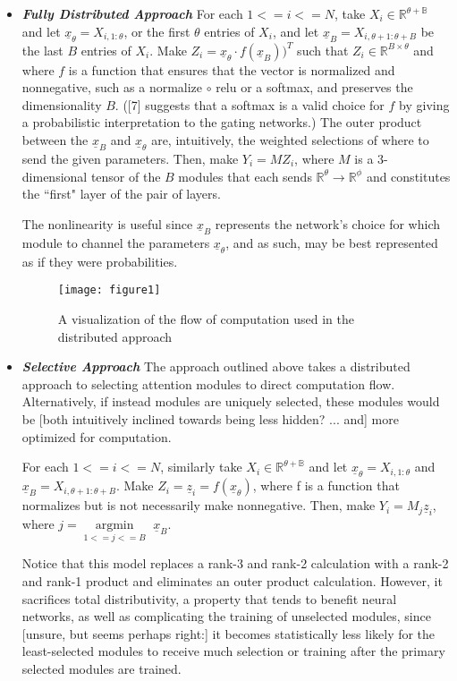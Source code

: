 \documentclass[12pt]{article}
\begin{document}
\begin{itemize}
	
\item \label{Fully Distributed} \textit{\textbf{Fully Distributed Approach}} For each $1<=i<=N$, take $X_i \in \mathbb{R^{\theta+B}}$ and let $\underline{x}_\theta = X_{i,1:\theta}$, or the first $\theta$ entries of $X_i$, and let $\underline{x}_B = X_{i, \theta+1:\theta+B}$ be the last $B$ entries of $X_i$.  Make $Z_i = \underline{x}_\theta \cdot f(\underline{x}_B))^{T}$ such that $Z_i \in \mathbb{R}^{B\times\theta}$ and where $f$ is a function that ensures that the vector is normalized and nonnegative, such as a normalize $\circ$ relu or a softmax, and preserves the dimensionality $B$.  ([7] suggests that a softmax is a valid choice for $f$ by giving a probabilistic interpretation to the gating networks.) The outer product between the $\underline{x}_B$ and $\underline{x}_\theta$ are, intuitively, the weighted selections of where to send the given parameters. Then, make $Y_i = MZ_i$, where $M$ is a 3-dimensional tensor of the $B$ modules that each sends $\mathbb{R}^{\theta}\rightarrow\mathbb{R}^{\phi}$ and constitutes the ``first" layer of the pair of layers.
\par The nonlinearity is useful since $\underline{x}_B$ represents the network's choice for which module to channel the parameters $\underline{x}_\theta$, and as such, may be best represented as if they were probabilities.\par
\begin{figure}[h]
\centering
\texttt{[image: figure1]}
\centering
\caption{A visualization of the flow of computation used in the distributed approach}
\end{figure}

\item \label{Selective Approach} \textit{\textbf{Selective Approach}} The approach outlined above takes a distributed approach to selecting attention modules to direct computation flow.  Alternatively, if instead modules are uniquely selected, these modules would be [both intuitively inclined towards being less hidden? ... and] more optimized for computation.\par
For each $1<=i<=N$, similarly take $X_i \in \mathbb{R^{\theta+B}}$ and let $\underline{x}_\theta = X_{i,1:\theta}$ and $\underline{x}_B = X_{i, \theta+1:\theta+B}$.  Make $Z_i = \underline{z}_i = f(\underline{x}_\theta)$, where f is a function that normalizes but is not necessarily make nonnegative.  Then, make $Y_i = M_j\underline{z}_i$, where $j = \underset{{1<=j<=B}}{\operatorname{argmin}}$ $ \underline{x}_B $.  \par
Notice that this model replaces a rank-3 and rank-2 calculation with a rank-2 and rank-1 product and eliminates an outer product calculation.  However, it sacrifices total distributivity, a property that tends to benefit neural networks, as well as complicating the training of unselected modules, since [unsure, but seems perhaps right:] it becomes statistically less likely for the least-selected modules to receive much selection or training after the primary selected modules are trained.

\end{itemize}
\end{document}
